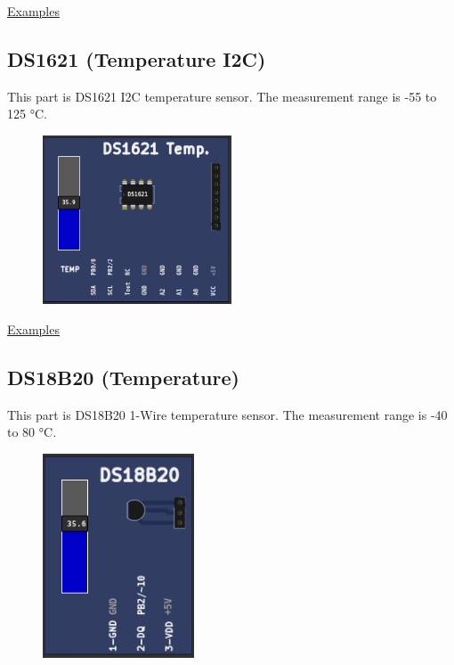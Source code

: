 \href{https://lcgamboa.github.io/picsimlab_examples/parts_DHT22_(Temp._Hum.).html}{Examples}

\vspace{0.5cm}

  
\subsection{DS1621 (Temperature I2C)}


This part is DS1621 I2C temperature sensor. The measurement range is -55 to 125 °C.

\begin{figure}[H]
\center
\includegraphics[width=0.5\textwidth]{img/part_ds1621.png} 
\end{figure} 


\href{https://lcgamboa.github.io/picsimlab_examples/parts_DS1621_(Temperature_I2C).html}{Examples}

\vspace{0.5cm}

\subsection{DS18B20 (Temperature)}

This part is DS18B20 1-Wire temperature sensor. The measurement range is -40 to 80 °C.

\begin{figure}[H]
\center
\includegraphics[width=0.4\textwidth]{img/part_ds18b20.png} 
\end{figure} 


